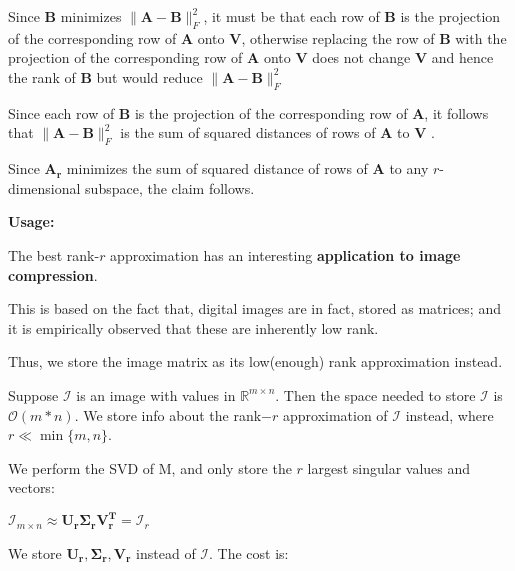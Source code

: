 \documentclass[fleqn, 11pt]{article}
\newcommand{\bs}[1]{\boldsymbol{#1}}
\newcommand{\R}[0]{\mathbb{R}}
\begin{document}
\medskip

Since  $\bs{B}$ minimizes $ \|\boldsymbol{A}-\boldsymbol{B}\|^2_F$, it must be that each row of $\bs{B}$ is the projection of the corresponding row of $\bs{A}$ onto $\bs{V}$, otherwise replacing the row of $\bs{B}$ with the projection of the corresponding row of $\bs{A}$ onto $\bs{V}$
does not change $\bs{V}$ and hence the rank of $\bs{B}$ but would reduce $ \|\boldsymbol{A}-\boldsymbol{B}\|^2_F$

\smallskip

Since each row
of $\bs{B}$ is the projection of the corresponding row of $\bs{A}$, it follows that $ \|\boldsymbol{A}-\boldsymbol{B}\|^2_F$ is the sum
of squared distances of rows of  $\bs{A}$  to  $\bs{V}$ .  

\smallskip

Since $\bs{A_r}$   minimizes 
the sum of squared distance
of rows of $\bs{A}$  to any $r$-dimensional subspace, the claim follows. 

\hrulefill

\bigskip 

\textbf{Usage: }

\medskip

The best rank-$r$
approximation has an interesting \textbf{application to image compression}. 

\smallskip

This is based on the fact that, digital images are in fact, stored as matrices; and it is 
empirically observed that these are inherently low rank.

\smallskip

Thus, we store the image matrix as its low(enough) rank approximation instead. 

\smallskip

Suppose $\mathcal{I}$ is an image with values in $\R^{m \times n}$. Then the space needed to store $\mathcal{I}$  
is $\mathcal{O}(m*n)$. We store info about the rank$-r$ approximation of 
$\mathcal{I}$ instead, where $r \ll \min\{m,n\}$. 

\smallskip

We perform the SVD of M, and only store the $r$ largest singular values and vectors:

\begin{center}
    $\mathcal{I}_{m \times n} \approx \bs{U_r \Sigma_r V_r ^T } = \mathcal{I}_r  $
\end{center}

We store $\bs{U_r,  \Sigma_r,  V_r }$ instead of  $\mathcal{I}$. The cost is:
\end{document}
